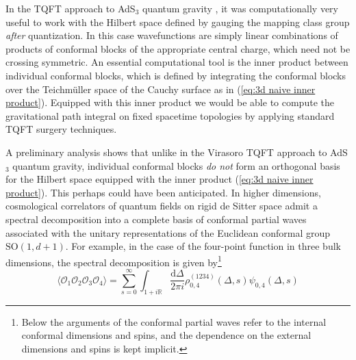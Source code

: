\documentclass[12pt,a4paper]{article}
\newcommand\SO{\text{SO}}
\renewcommand\d{\text{d}}
\begin{document}
In the TQFT approach to AdS$_3$ quantum gravity \cite{Collier:2023fwi, Collier:2024mgv}, it was computationally very useful to work with the Hilbert space defined by gauging the mapping class group \emph{after} quantization. In this case wavefunctions are simply linear combinations of products of conformal blocks of the appropriate central charge, which need not be crossing symmetric. An essential computational tool is the inner product between individual conformal blocks, which is defined by integrating the conformal blocks over the Teichm\"uller space of the Cauchy surface as in (\ref{eq:3d naive inner product}). Equipped with this inner product we would be able to compute the gravitational path integral on fixed spacetime topologies by applying standard TQFT surgery techniques.

A preliminary analysis shows that unlike in the Virasoro TQFT approach to AdS$_3$ quantum gravity, individual conformal blocks \emph{do not} form an orthogonal basis for the Hilbert space equipped with the inner product (\ref{eq:3d naive inner product}). This perhaps could have been anticipated. In higher dimensions, cosmological correlators of quantum fields on rigid de Sitter space admit a spectral decomposition into a complete basis of conformal partial waves associated with the unitary representations of the Euclidean conformal group $\SO(1,d+1)$. For example, in the case of the four-point function in three bulk dimensions, the spectral decomposition is given by\footnote{Below the arguments of the conformal partial waves refer to the internal conformal dimensions and spins, and the dependence on the external dimensions and spins is kept implicit.}
\begin{equation}\label{eq:spec decomp of cosmo correlator}
    \langle\mathcal{O}_1\mathcal{O}_2\mathcal{O}_3\mathcal{O}_4\rangle = \sum_{s = 0}^\infty \int_{1+i\mathbb{R}}\frac{\d\Delta}{2\pi i}\rho^{(1234)}_{0,4}(\Delta,s)\psi_{0,4}(\Delta,s)
\end{equation}
\end{document}
